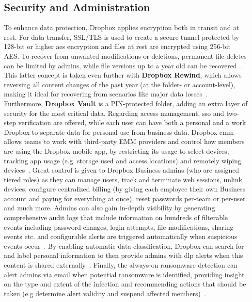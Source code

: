 \subsection{Security and Administration}
To enhance data protection, Dropbox applies encryption both in transit and at rest. For data transfer, SSL/TLS is used to create a secure tunnel protected by 128-bit or higher \ac{aes} encryption and files at rest are encrypted using 256-bit AES. To recover from unwanted modifications or deletions, permanent file deletes can be limited by admins, while file versions up to a year old can be recovered~\cite{dropbox_security}. This latter concept is taken even further with \textbf{Dropbox Rewind}, which allows reversing all content changes of the past year (at the folder- or account-level), making it ideal for recovering from scenarios like major data losses~\cite{dropbox_rewind}. Furthermore, \textbf{Dropbox Vault} is a PIN-protected folder, adding an extra layer of security for the most critical data. Regarding access management, \ac{sso} and two-step verification are offered, while each user can have both a personal and a work Dropbox to separate data for personal use from business data. Dropbox \ac{emm} allows teams to work with third-party EMM providers and control how members are using the Dropbox mobile app, by restricting its usage to select devices, tracking app usage (e.g. storage used and access locations) and remotely wiping devices~\cite{dropbox_emm}. Great control is given to Dropbox Business admins (who are assigned tiered roles) as they can manage users, track and terminate web sessions, unlink devices, configure centralized billing (by giving each employee their own Business account and paying for everything at once), reset passwords per-team or per-user and much more.  Admins can also gain in-depth visibility by generating comprehensive audit logs that include information on hundreds of filterable events including password changes, login attempts, file modifications, sharing events etc. and configurable alerts are triggered automatically when suspicious events occur~\cite{dropbox_admin}. By enabling automatic data classification, Dropbox can search for and label personal information to then provide admins with \ac{dlp} alerts when this content is shared externally~\cite{dropbox_dlp}. Finally, the always-on ransomware detection can alert admins via email when potential ransomware is identified, providing insight on the type and extent of the infection and recommending actions that should be taken (e.g determine alert validity and suspend affected members)~\cite{dropbox_ransomware,dropbox}.

